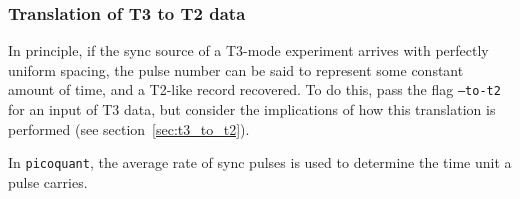 \documentclass{article}
\newcommand{\picoquant}{\texttt{picoquant}}
\begin{document}
\subsubsection{Translation of T3 to T2 data}
In principle, if the sync source of a T3-mode experiment arrives with perfectly uniform spacing, the pulse number can be said to represent some constant amount of time, and a T2-like record recovered. To do this, pass the flag \texttt{--to-t2} for an input of T3 data, but consider the implications of how this translation is performed (see section~\ref{sec:t3_to_t2}). 

In \picoquant, the average rate of sync pulses is used to determine the time unit a pulse carries.

%
%
\end{document}

